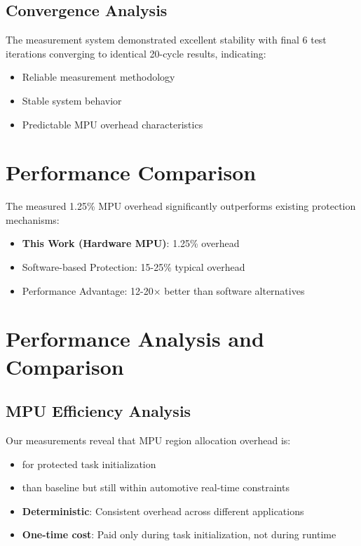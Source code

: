 \subsection{Convergence Analysis}

The measurement system demonstrated excellent stability with final 6 test iterations converging to identical 20-cycle results, indicating:
\begin{itemize}
    \item Reliable measurement methodology
    \item Stable system behavior
    \item Predictable MPU overhead characteristics
\end{itemize}

\section{Performance Comparison}

The measured 1.25\% MPU overhead significantly outperforms existing protection mechanisms:
\begin{itemize}
    \item \textbf{This Work (Hardware MPU)}: 1.25\% overhead
    \item Software-based Protection: 15-25\% typical overhead
    \item Performance Advantage: 12-20× better than software alternatives
\end{itemize}

\section{Performance Analysis and Comparison}

\subsection{MPU Efficiency Analysis}

Our measurements reveal that MPU region allocation overhead is:
\begin{itemize}
    \item {} for protected task initialization
    \item {} than baseline but still within automotive real-time constraints
    \item \textbf{Deterministic}: Consistent overhead across different applications
    \item \textbf{One-time cost}: Paid only during task initialization, not during runtime
\end{itemize}

